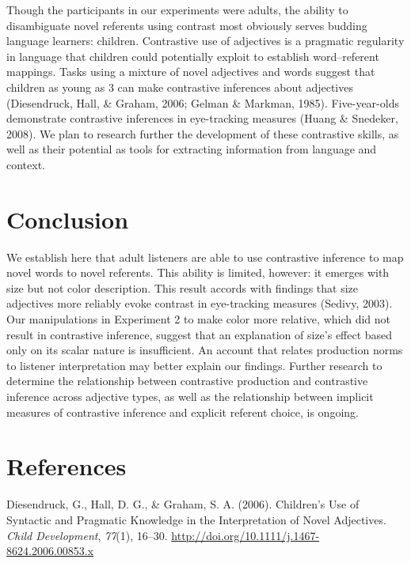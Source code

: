 \documentclass[10pt, letterpaper]{article}
\begin{document}
Though the participants in our experiments were adults, the ability to
disambiguate novel referents using contrast most obviously serves
budding language learners: children. Contrastive use of adjectives is a
pragmatic regularity in language that children could potentially exploit
to establish word--referent mappings. Tasks using a mixture of novel
adjectives and words suggest that children as young as 3 can make
contrastive inferences about adjectives (Diesendruck, Hall, \& Graham,
2006; Gelman \& Markman, 1985). Five-year-olds demonstrate contrastive
inferences in eye-tracking measures (Huang \& Snedeker, 2008). We plan
to research further the development of these contrastive skills, as well
as their potential as tools for extracting information from language and
context.

\section{Conclusion}\label{conclusion}

We establish here that adult listeners are able to use contrastive
inference to map novel words to novel referents. This ability is
limited, however: it emerges with size but not color description. This
result accords with findings that size adjectives more reliably evoke
contrast in eye-tracking measures (Sedivy, 2003). Our manipulations in
Experiment 2 to make color more relative, which did not result in
contrastive inference, suggest that an explanation of size's effect
based only on its scalar nature is insufficient. An account that relates
production norms to listener interpretation may better explain our
findings. Further research to determine the relationship between
contrastive production and contrastive inference across adjective types,
as well as the relationship between implicit measures of contrastive
inference and explicit referent choice, is ongoing.

\section*{References}\label{references}

\hypertarget{refs}{}
\hypertarget{ref-diesendruck_childrens_2006}{}
Diesendruck, G., Hall, D. G., \& Graham, S. A. (2006). Children's Use of
Syntactic and Pragmatic Knowledge in the Interpretation of Novel
Adjectives. \emph{Child Development}, \emph{77}(1), 16--30.
\url{http://doi.org/10.1111/j.1467-8624.2006.00853.x}
\end{document}
